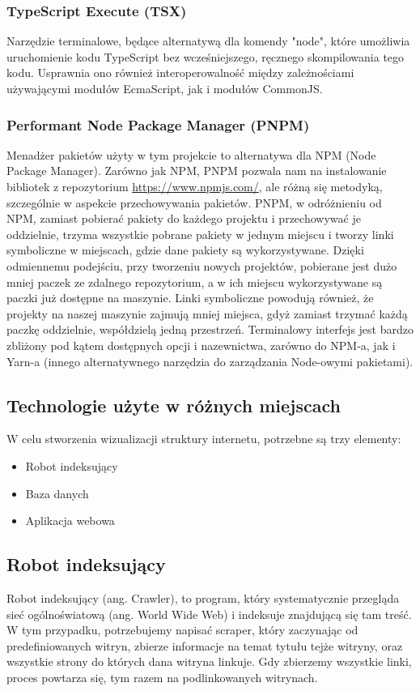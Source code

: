 \documentclass[a4paper, 12pt]{article}
\begin{document}
\subsubsection{TypeScript Execute (TSX)}
Narzędzie terminalowe, będące alternatywą dla komendy "node", które umożliwia uruchomienie kodu TypeScript bez wcześniejszego, ręcznego skompilowania tego kodu. Usprawnia ono również interoperowalność między zależnościami używającymi modułów EcmaScript, jak i modułów CommonJS.\cite{npmTsxReadme}
\subsubsection{Performant Node Package Manager (PNPM)}
Menadżer pakietów użyty w tym projekcie to alternatywa dla NPM (Node Package Manager). Zarówno jak NPM, PNPM pozwala nam na instalowanie bibliotek z repozytorium \url{https://www.npmjs.com/}, ale różną się metodyką, szczególnie w aspekcie przechowywania pakietów. PNPM, w odróżnieniu od NPM, zamiast pobierać pakiety do każdego projektu i przechowywać je oddzielnie, trzyma wszystkie pobrane pakiety w jednym miejscu i tworzy linki symboliczne w miejscach, gdzie dane pakiety są wykorzystywane.\cite{introPnpmDoc} Dzięki odmiennemu podejściu, przy tworzeniu nowych projektów, pobierane jest dużo mniej paczek ze zdalnego repozytorium, a w ich miejscu wykorzystywane są paczki już dostępne na maszynie. Linki symboliczne powodują również, że projekty na naszej maszynie zajmują mniej miejsca, gdyż zamiast trzymać każdą paczkę oddzielnie, współdzielą jedną przestrzeń. Terminalowy interfejs jest bardzo zbliżony pod kątem dostępnych opcji i nazewnictwa, zarówno do NPM-a, jak i Yarn-a (innego alternatywnego narzędzia do zarządzania Node-owymi pakietami).

\subsection{Technologie użyte w różnych miejscach}
W celu stworzenia wizualizacji struktury internetu, potrzebne są trzy elementy:
\begin{itemize}
	\item Robot indeksujący
	\item Baza danych
	\item Aplikacja webowa
\end{itemize}

\subsection{Robot indeksujący}
Robot indeksujący (ang. Crawler), to program, który systematycznie przegląda sieć ogólnoświatową (ang. World Wide Web) i indeksuje znajdującą się tam treść.\cite{cloudflareWebCrawler}\cite{wikiWebCrawler} W tym przypadku, potrzebujemy napisać scraper, który zaczynając od predefiniowanych witryn, zbierze informacje na temat tytułu tejże witryny, oraz wszystkie strony do których dana witryna linkuje. Gdy zbierzemy wszystkie linki, proces powtarza się, tym razem na podlinkowanych witrynach.
\end{document}
